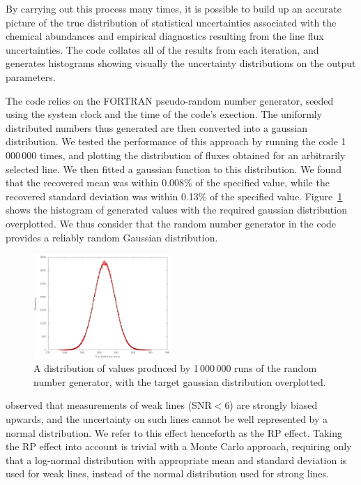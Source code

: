 \documentclass[useAMS,usenatbib]{mn2e}
\begin{document}
By carrying out this process many times, it is possible to build up an accurate picture of the true distribution of statistical uncertainties associated with the chemical abundances and empirical diagnostics resulting from the line flux uncertainties. The code collates all of the results from each iteration, and generates histograms showing visually the uncertainty distributions on the output parameters.

The code relies on the FORTRAN pseudo-random number generator, seeded using the system clock and the time of the code's exection.  The uniformly distributed numbers thus generated are then converted into a gaussian distribution.  We tested the performance of this approach by running the code 1\,000\,000 times, and plotting the distribution of fluxes obtained for an arbitrarily selected line.  We then fitted a gaussian function to this distribution.  We found that the recovered mean was within 0.008\% of the specified value, while the recovered standard deviation was within 0.13\% of the specified value.  Figure~\ref{gaussiantest} shows the histogram of generated values with the required gaussian distribution overplotted.  We thus consider that the random number generator in the code provides a reliably random Gaussian distribution.

\begin{figure}
\includegraphics[width=0.47\textwidth]{figures/gaussian_test.png}
\caption{A distribution of values produced by 1\,000\,000 runs of the random number generator, with the target gaussian distribution overplotted.}
\label{gaussiantest}
\end{figure}


\citet{1994A&A...287..676R} observed that measurements of weak lines (SNR$<$6) are strongly biased upwards, and the uncertainty on such lines cannot be well represented by a normal distribution.  We refer to this effect henceforth as the RP effect.  Taking the RP effect into account is trivial with a Monte Carlo approach, requiring only that a log-normal distribution with appropriate mean and standard deviation is used for weak lines, instead of the normal distribution used for strong lines.
\end{document}
